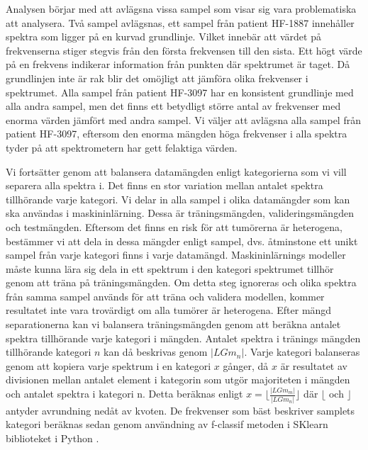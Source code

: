 Analysen börjar med att avlägsna vissa sampel som visar sig vara problematiska att analysera. Två sampel avlägsnas, ett sampel från patient HF-1887 innehåller spektra som ligger på en kurvad grundlinje. Vilket innebär att värdet på frekvenserna stiger stegvis från den första frekvensen till den sista. Ett högt värde på en frekvens indikerar information från punkten där spektrumet är taget. Då grundlinjen inte är rak blir det omöjligt att jämföra olika frekvenser i spektrumet. Alla sampel från patient HF-3097 har en konsistent grundlinje med alla andra sampel, men det finns ett betydligt större antal av frekvenser med enorma värden jämfört med andra sampel. Vi väljer att avlägsna alla sampel från patient HF-3097, eftersom den enorma mängden höga frekvenser i alla spektra tyder på att spektrometern har gett felaktiga värden.

Vi fortsätter genom att balansera datamängden enligt kategorierna som vi vill separera alla spektra i. Det finns en stor variation mellan antalet spektra tillhörande varje kategori. Vi delar in alla sampel i olika datamängder som kan ska användas i maskininlärning. Dessa är träningsmängden, valideringsmängden och testmängden. Eftersom det finns en risk för att tumörerna är heterogena, bestämmer vi att dela in dessa mängder enligt sampel, dvs. åtminstone ett unikt sampel från varje kategori finns i varje datamängd. Maskininlärnings modeller måste kunna lära sig dela in ett spektrum i den kategori spektrumet tillhör genom att träna på träningsmängden. Om detta steg ignoreras och olika spektra från samma sampel används för att träna och validera modellen, kommer resultatet inte vara trovärdigt om alla tumörer är heterogena. Efter mängd separationerna kan vi balansera träningsmängden genom att beräkna antalet spektra tillhörande varje kategori i mängden. Antalet spektra i tränings mängden tillhörande kategori $n$ kan då beskrivas genom $|LGm_n|$. Varje kategori balanseras genom att kopiera varje spektrum i en kategori $x$ gånger, då $x$ är resultatet av divisionen mellan antalet element i kategorin som utgör majoriteten i mängden och antalet spektra i kategori n. Detta beräknas enligt $x = \lfloor \frac{|LGm_m|}{|LGm_n|} \rfloor$ där $\lfloor$ och $\rfloor$ antyder avrundning nedåt av kvoten. De frekvenser som bäst beskriver samplets kategori beräknas sedan genom användning av f-classif metoden i SKlearn biblioteket i Python \cite{scikit}.

